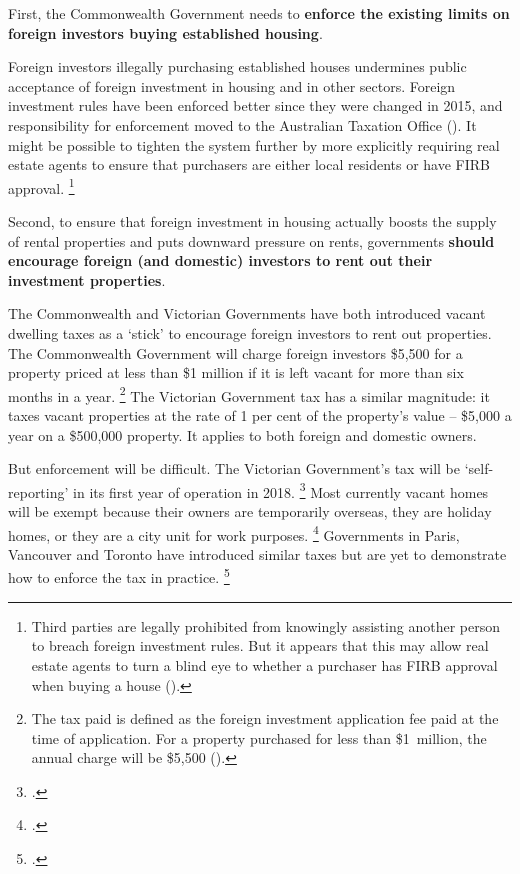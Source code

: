 First, the Commonwealth Government needs to \textbf{enforce the existing limits on foreign investors buying established housing}.

Foreign investors illegally purchasing established houses undermines public acceptance of foreign investment in housing and in other sectors.
Foreign investment rules have been enforced better since they were changed in 2015, and responsibility for enforcement moved to the Australian Taxation Office ().
It might be possible to tighten the system further by more explicitly requiring real estate agents to ensure that purchasers are either local residents or have FIRB approval.%
	\footnote{Third parties are legally prohibited from knowingly assisting another person to breach foreign investment rules.
    But it appears that this may allow real estate agents to turn a blind eye to whether a purchaser has FIRB approval when buying a house (\textcite{FIRB2016ThirdParty}).}

Second, to ensure that foreign investment in housing actually boosts the supply of rental properties and puts downward pressure on rents, governments \textbf{should encourage foreign (and domestic) investors to rent out their investment properties}.

The Commonwealth and Victorian Governments have both introduced vacant dwelling taxes as a `stick' to encourage foreign investors to rent out properties.
The Commonwealth Government will charge foreign investors \$5,500 for a property priced at less than \$1 million if it is left vacant for more than six months in a year.%
	\footnote{The tax paid is defined as the foreign investment application fee paid at the time of application.
    For a property purchased for less than \$1~million, the annual charge will be \$5,500 (\textcite{Budget1718-Stronger-rules-foreign-investors-own-Aust-housing}).}
The Victorian Government tax has a similar magnitude: it taxes vacant properties at the rate of 1 per cent of the property's value -- \$5,000 a year on a \$500,000 property.
It applies to both foreign and domestic owners.

But enforcement will be difficult.
The Victorian Government's tax will be `self-reporting' in its first year of operation in 2018.%
	\footcite[][14]{VicStateGov2017Homes}
Most currently vacant homes will be exempt because their owners are temporarily overseas, they are holiday homes, or they are a city unit for work purposes.%
	\footcites{SGSCensus2017}{DaleyCoates-2017-theAge-Stamp-duty-wont-help-housing-affordability}
Governments in Paris, Vancouver and Toronto have introduced similar taxes but are yet to demonstrate how to enforce the tax in practice.%
	\footcite{Pawson-2017-theConvo-Taxing-empty-homes}

